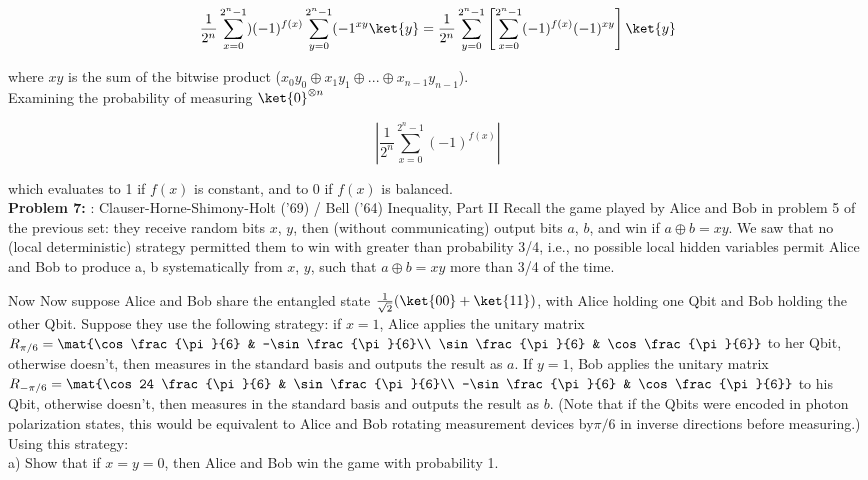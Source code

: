 $$\frac{1}{2^n}\sum^{2^n-1}_{x=0})(-1)^{f(x)}\sum^{2^n-1}_{y=0}(-1^{xy}\ket{y}=\frac{1}{2^n}\sum^{2^n-1}_{y=0}\left[\sum^{2^n-1}_{x=0}(-1)^{f(x)}(-1)^{xy}\right]\ket{y}$$

where $xy$ is the sum of the bitwise product ($x_0y_0\oplus x_1y_1\oplus
...\oplus x_{n-1}y_{n-1}$).\\

Examining the probability of measuring $\ket{0}^{\otimes n}$

$$\left|\frac{1}{2^n}\sum^{2^n-1}_{x=0}(-1)^{f(x)}\right|$$

which evaluates to 1 if $f(x)$ is constant, and to 0 if $f(x)$ is balanced.\\





\textbf{Problem 7:} : Clauser-Horne-Shimony-Holt (’69) / Bell (’64)
Inequality, Part II
Recall the game played by Alice and Bob in problem 5 of the previous set:
they receive
random bits $x$, $y$, then (without communicating) output bits $a$, $b$, and win if $a\oplus b =xy$. We saw that no (local deterministic) strategy permitted them to win with greater than
probability 3/4, i.e., no possible local hidden variables permit Alice and Bob
to produce
a, b systematically from $x$, $y$, such that $a \oplus b=xy$ more than 3/4 of
the time.

Now Now suppose Alice and Bob share the entangled state
$\frac{1}{\sqrt{2}}(\ket{00}+\ket{11})$, with Alice
holding one Qbit and Bob holding the other Qbit. Suppose they use the
following strategy:
if $x = 1$, Alice applies the unitary matrix $R_{\pi/6}=\mat{\cos
\frac{\pi}{6} & -\sin\frac{\pi}{6}\\ \sin\frac{\pi}{6} & \cos\frac{\pi}{6}}$ to
her Qbit, otherwise
doesn't, then measures in the standard basis and outputs the result as $a$. If $y =
1$, Bob
applies the unitary matrix$R_{-\pi/6}=\mat{\cos
 24 \frac{\pi}{6} & \sin\frac{\pi}{6}\\ -\sin\frac{\pi}{6} & \cos\frac{\pi}{6}}$ to his Qbit, otherwise  doesn’t, then
 measures in the standard basis and outputs the result as $b$. (Note that if the
 Qbits were
 encoded in photon polarization states, this would be equivalent to Alice and
 Bob rotating
 measurement devices by$\pi/6$ in inverse directions before measuring.)
 Using this strategy:\\

 a) Show that if $x=y=0$, then Alice and Bob win the game with probability
 1.\\

